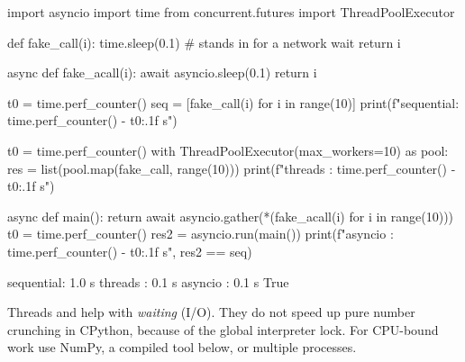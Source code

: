 \begin{pycode}
import asyncio
import time
from concurrent.futures import ThreadPoolExecutor

def fake_call(i):
    time.sleep(0.1)                  # stands in for a network wait
    return i

async def fake_acall(i):
    await asyncio.sleep(0.1)
    return i

t0 = time.perf_counter()
seq = [fake_call(i) for i in range(10)]
print(f"sequential: {time.perf_counter() - t0:.1f} s")

t0 = time.perf_counter()
with ThreadPoolExecutor(max_workers=10) as pool:
    res = list(pool.map(fake_call, range(10)))
print(f"threads   : {time.perf_counter() - t0:.1f} s")

async def main():
    return await asyncio.gather(*(fake_acall(i) for i in range(10)))
t0 = time.perf_counter()
res2 = asyncio.run(main())
print(f"asyncio   : {time.perf_counter() - t0:.1f} s", res2 == seq)
\end{pycode}
\begin{rawcode}
sequential: 1.0 s
threads   : 0.1 s
asyncio   : 0.1 s True
\end{rawcode}

\begin{center}
\end{center}

\begin{typecheck}
Threads and  help with \emph{waiting} (I/O). They do not speed up pure number
crunching in CPython, because of the global interpreter lock. For CPU-bound work use NumPy, a
compiled tool below, or multiple processes.
\end{typecheck}

